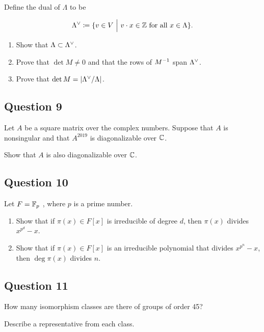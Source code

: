 \documentclass[12pt]{article}
\begin{document}
Define the dual of \(\Lambda\) to be

\[
\Lambda ^\vee \coloneqq \{v \in V {~\mathrel{\Big|}~} v \cdot x \in {\mathbb{Z}} \text{ for all } x \in \Lambda
\}
.\]

\begin{enumerate}
\def\labelenumi{(\alph{enumi})}
\item
  Show that \(\Lambda \subset \Lambda ^\vee\).
\item
  Prove that \(\det M \neq 0\) and that the rows of \(M^{-1}\) span
  \(\Lambda^\vee\).
\item
  Prove that \(\det M = |\Lambda^\vee /\Lambda|\).
\end{enumerate}

\hypertarget{question-9}{%
\subsection{Question 9}\label{question-9}}

Let \(A\) be a square matrix over the complex numbers. Suppose that
\(A\) is nonsingular and that \(A^{2019}\) is diagonalizable over
\({\mathbb{C}}\).

Show that \(A\) is also diagonalizable over \({\mathbb{C}}\).

\hypertarget{question-10}{%
\subsection{Question 10}\label{question-10}}

Let \(F = {\mathbb{F}}_p\) , where \(p\) is a prime number.

\begin{enumerate}
\def\labelenumi{(\alph{enumi})}
\item
  Show that if \(\pi(x) \in F[x]\) is irreducible of degree \(d\), then
  \(\pi(x)\) divides \(x^{p^d} - x\).
\item
  Show that if \(\pi(x) \in F[x]\) is an irreducible polynomial that
  divides \(x^{p^n} - x\), then \(\deg \pi(x)\) divides \(n\).
\end{enumerate}

\hypertarget{question-11}{%
\subsection{Question 11}\label{question-11}}

How many isomorphism classes are there of groups of order 45?

Describe a representative from each class.
\end{document}
